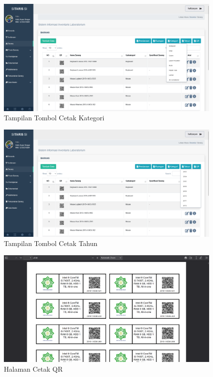 \begin{enumerate}
        \begin{figure}
          \centering
          \includegraphics[width=0.82\linewidth]{konten//gambar/barang cetak kategori.png}
          \caption{Tampilan Tombol Cetak Kategori}
          \label{fig:enter-label}
        \end{figure}

        \begin{figure}
          \centering
          \includegraphics[width=0.82\linewidth]{konten//gambar/barang cetak tahun.png}
          \caption{Tampilan Tombol Cetak Tahun}
          \label{fig:enter-label}
        \end{figure}

        \begin{figure}
          \centering
          \includegraphics[width=0.82\linewidth]{konten//gambar/barang cetak qr.png}
          \caption{Halaman Cetak QR}
          \label{fig:enter-label}
        \end{figure}


\end{enumerate}
